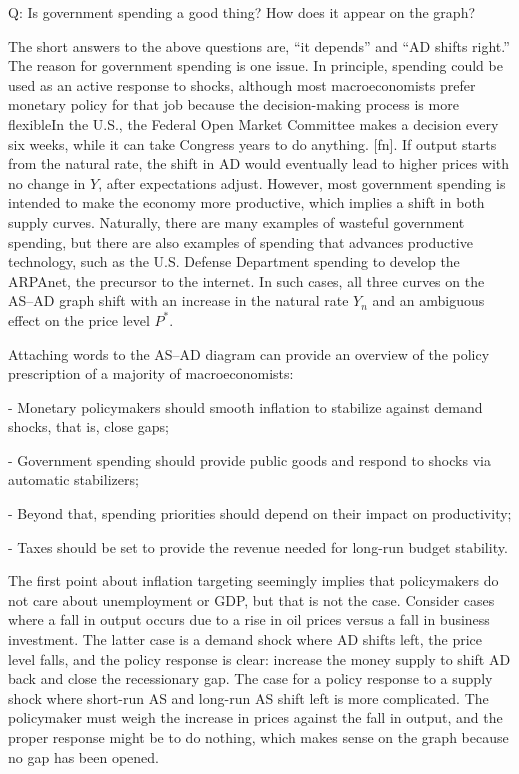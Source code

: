 ﻿\documentclass[oneside]{book}
\begin{document}
Q: Is government spending a good thing? How does it appear on the graph?

The short answers to the above questions are, ``it depends'' and ``AD shifts
right.'' The reason for government spending is one issue. In
principle, spending could be used as an active response to shocks, although
most macroeconomists prefer monetary policy for that job because the decision-making process is more flexibleIn the U.S., the Federal Open Market Committee makes a decision every six weeks, while it can take
Congress years to do anything. [fn]. If output starts from the natural rate,
the shift in AD would eventually lead to higher prices with no change
in $Y$, after expectations adjust. However, most government spending is
intended to make the economy more productive, which implies a shift in both
supply curves. Naturally, there are many examples of wasteful government
spending, but there are also examples of spending that advances productive technology, such as the U.S. Defense Department
spending to develop the ARPAnet, the precursor to the internet. In such cases, all three curves on the AS--AD graph shift with an increase in the natural rate $Y_{n}$ and an ambiguous effect on the price level $P^{\ast}$.

Attaching words to the AS--AD diagram can provide an overview of the policy
prescription of a majority of macroeconomists:


- Monetary policymakers should smooth inflation to stabilize
against demand shocks, that is, close gaps;

- Government spending should provide public goods and respond to shocks
via automatic stabilizers;

- Beyond that, spending priorities should depend on their impact on
productivity;

- Taxes should be set to provide the revenue needed for long-run budget
stability.

The first point about inflation targeting seemingly implies that policymakers
do not care about unemployment or GDP, but that is not the case. Consider cases where a fall in output occurs due to a rise in oil prices versus a
fall in business investment. The latter case is a demand shock where AD
shifts left, the price level falls, and the policy response is clear:
increase the money supply to shift AD back and close the recessionary gap.
The case for a policy response to a supply shock where short-run AS and long-run AS shift left is more complicated. The policymaker must weigh the increase in prices against the fall in output, and the proper response might be to do nothing, which makes sense on the graph because no gap has been opened.
\end{document}
